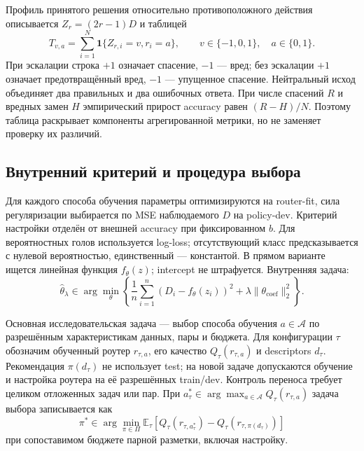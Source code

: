 Профиль принятого решения относительно противоположного действия
описывается $Z_r=(2r-1)D$ и таблицей
\begin{equation}
 T_{v,a}=\sum_{i=1}^{N}\mathbf1\{Z_{r,i}=v,r_i=a\},
 \qquad v\in\{-1,0,1\},\quad a\in\{0,1\}.
\end{equation}
При эскалации строка $+1$ означает спасение, $-1$ --- вред;
без эскалации $+1$ означает предотвращённый вред, $-1$ --- упущенное
спасение. Нейтральный исход объединяет два правильных и два ошибочных
ответа. При числе спасений $R$ и вредных замен $H$ эмпирический прирост
accuracy равен $(R-H)/N$. Поэтому таблица раскрывает компоненты
агрегированной метрики, но не заменяет проверку их различий.

\subsection{Внутренний критерий и процедура выбора}
Для каждого способа обучения параметры оптимизируются на router-fit,
сила регуляризации выбирается по MSE наблюдаемого $D$ на policy-dev.
Критерий настройки отделён от внешней accuracy при фиксированном $b$.
Для вероятностных голов используется log-loss; отсутствующий класс
предсказывается с нулевой вероятностью, единственный --- константой.
В прямом варианте ищется линейная функция $f_\theta(z)$; intercept
не штрафуется. Внутренняя задача:
\begin{equation}\label{eq:argmin}
\widehat\theta_\lambda\in\arg\min_\theta
\left\{\frac1n\sum_{i=1}^{n}(D_i-f_\theta(z_i))^2+
\lambda\|\theta_{\mathrm{coef}}\|_2^2\right\}.
\end{equation}

Основная исследовательская задача --- выбор способа обучения
$a\in\mathcal A$ по разрешённым характеристикам данных, пары и бюджета.
Для конфигурации $\tau$ обозначим обученный роутер $r_{\tau,a}$,
его качество $Q_\tau(r_{\tau,a})$ и descriptors $d_\tau$.
Рекомендация $\pi(d_\tau)$ не использует test; на новой задаче допускаются
обучение и настройка роутера на её разрешённых train/dev. Контроль
переноса требует целиком отложенных задач или пар. При
$a_\tau^*\in\arg\max_{a\in\mathcal A}Q_\tau(r_{\tau,a})$
задача выбора записывается как
\begin{equation}\label{eq:selection}
\pi^*\in\arg\min_{\pi\in\Pi}
\mathbb E_\tau\left[Q_\tau(r_{\tau,a_\tau^*})-
Q_\tau(r_{\tau,\pi(d_\tau)})\right]
\end{equation}
при сопоставимом бюджете парной разметки, включая настройку.
